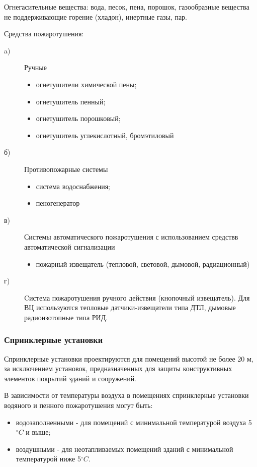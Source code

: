 Огнегасительные вещества: вода, песок, пена, порошок, газообразные вещества не поддерживающие горение (хладон), инертные газы, пар.

Средства пожаротушения:
\begin{description}
\item[a)]Ручные
	\begin{itemize}
	\item огнетушители химической пены;
	\item огнетушитель пенный;
	\item огнетушитель порошковый;
	\item огнетушитель углекислотный, бромэтиловый
	\end{itemize}

\item[б)] Противопожарные системы
	\begin{itemize}
	\item система водоснабжения;
	\item пеногенератор
	\end{itemize}

\item[в)] Системы автоматического пожаротушения с использованием средствв автоматической сигнализации
	\begin{itemize}
	\item пожарный извещатель (тепловой, световой, дымовой, радиационный)
	\end{itemize}

\item[г)] Cистема пожаротушения ручного действия (кнопочный извещатель).
Для ВЦ используются тепловые датчики-извещатели типа ДТЛ, дымовые радиоизотопные типа РИД.
\end{description}

\subsubsection*{Спринклерные установки}

Спринклерные установки проектируются для помещений высотой не более 20 м, за исключением установок, предназначенных для защиты
конструктивных элементов покрытий зданий и сооружений.

В зависимости от температуры воздуха в помещениях спринклерные установки водяного и пенного пожаротушения могут быть:
\begin{itemize}
\item водозаполненными - для помещений с минимальной температурой воздуха 5${^\circ{C}}$ и выше;
\item воздушными - для неотапливаемых помещений зданий с минимальной температурой ниже 5${^\circ{C}}$.
\end{itemize}
 
